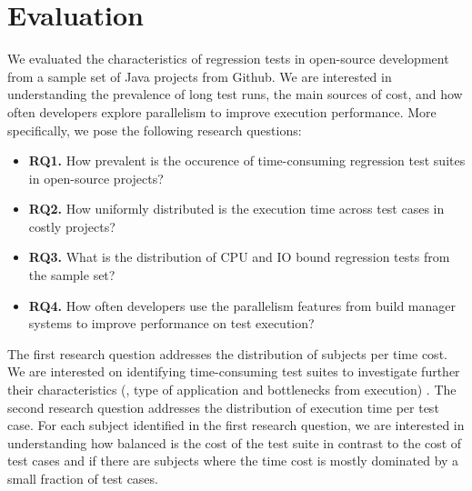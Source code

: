 \section{Evaluation}
\label{sec:eval}


We evaluated the characteristics of regression tests in open-source
development from a sample set of Java projects from
Github. We are interested in understanding the prevalence
of long test runs, the main sources of cost, and how often developers
explore parallelism to improve execution performance. More
specifically, we pose the following research questions:

\newcommand{\RQA}{How prevalent is the occurence of time-consuming
regression test suites in open-source projects?}

\newcommand{\RQB}{What is the distribution of CPU and IO bound
regression tests from the sample set?}

\newcommand{\RQC}{How uniformly distributed is the execution time
across test cases in costly projects?}

\newcommand{\RQD}{How often developers use the parallelism features
from build manager systems to improve performance on test execution?}

\newcommand{\rqOne}{\textbf{RQ1.} \RQA}
\newcommand{\rqTwo}{\textbf{RQ2.} \RQC}
\newcommand{\rqThree}{\textbf{RQ3.} \RQB}
\newcommand{\rqFour}{\textbf{RQ4.} \RQD}

\begin{itemize}
    \item \rqOne
    \item \rqTwo
    \item \rqThree
    \item \rqFour
\end{itemize}

The first research question addresses the distribution of subjects per
time cost. We are interested on identifying time-consuming test suites
to investigate further their characteristics (\eg, type of application
and bottlenecks from execution) .
The second research question addresses the distribution of execution
time per test case. For each subject identified in the first research
question, we are interested in understanding how balanced is the cost
of the test suite in contrast to the cost of test cases and if there
are subjects where the time cost is mostly dominated by a small
fraction of test cases.


